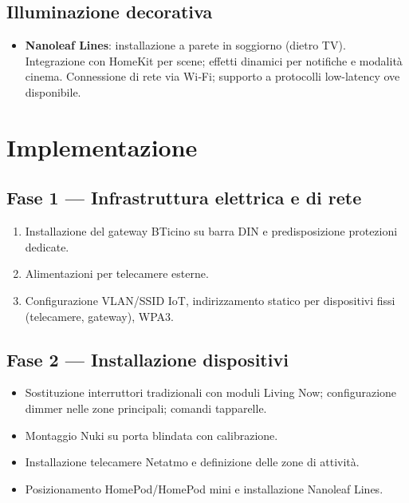 \subsection*{Illuminazione decorativa}
\begin{itemize}
  \item \textbf{Nanoleaf Lines}: installazione a parete in soggiorno (dietro TV). Integrazione con HomeKit per scene; effetti dinamici per notifiche e modalità cinema. Connessione di rete via Wi‑Fi; supporto a protocolli low-latency ove disponibile.
\end{itemize}

\section{Implementazione}
\subsection{Fase 1 — Infrastruttura elettrica e di rete}
\begin{enumerate}
  \item Installazione del gateway BTicino su barra DIN e predisposizione protezioni dedicate.
  \item Alimentazioni per telecamere esterne.
  \item Configurazione VLAN/SSID IoT, indirizzamento statico per dispositivi fissi (telecamere, gateway), WPA3.
\end{enumerate}

\subsection{Fase 2 — Installazione dispositivi}
\begin{itemize}
  \item Sostituzione interruttori tradizionali con moduli Living Now; configurazione dimmer nelle zone principali; comandi tapparelle.
  \item Montaggio Nuki su porta blindata con calibrazione.
  \item Installazione telecamere Netatmo e definizione delle zone di attività.
  \item Posizionamento HomePod/HomePod mini e installazione Nanoleaf Lines.
\end{itemize}

